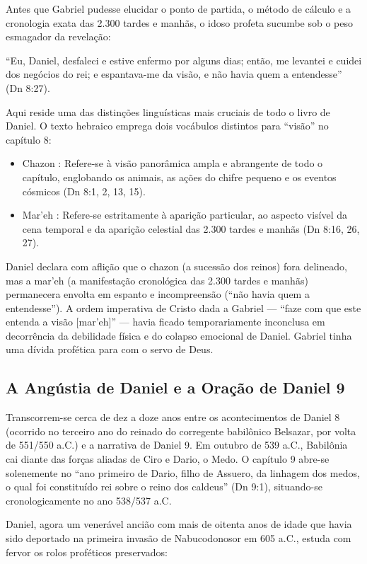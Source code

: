 \documentclass[11pt,a4paper,openany]{book}
\begin{document}
Antes que Gabriel pudesse elucidar o ponto de partida, o método de cálculo e a cronologia exata das 2.300 tardes e manhãs, o idoso profeta sucumbe sob o peso esmagador da revelação:

``Eu, Daniel, desfaleci e estive enfermo por alguns dias; então, me levantei e cuidei dos negócios do rei; e espantava-me da visão, e não havia quem a entendesse'' (Dn 8:27).

Aqui reside uma das distinções linguísticas mais cruciais de todo o livro de Daniel. O texto hebraico emprega dois vocábulos distintos para ``visão'' no capítulo 8:
\begin{itemize}
  \item Chazon : Refere-se à visão panorâmica ampla e abrangente de todo o capítulo, englobando os animais, as ações do chifre pequeno e os eventos cósmicos (Dn 8:1, 2, 13, 15).
  \item Mar'eh : Refere-se estritamente à aparição particular, ao aspecto visível da cena temporal e da aparição celestial das 2.300 tardes e manhãs (Dn 8:16, 26, 27).
\end{itemize}


Daniel declara com aflição que o chazon (a sucessão dos reinos) fora delineado, mas a mar'eh (a manifestação cronológica das 2.300 tardes e manhãs) permanecera envolta em espanto e incompreensão (``não havia quem a entendesse''). A ordem imperativa de Cristo dada a Gabriel — ``faze com que este entenda a visão [mar'eh]'' — havia ficado temporariamente inconclusa em decorrência da debilidade física e do colapso emocional de Daniel. Gabriel tinha uma dívida profética para com o servo de Deus.



\subsection{A Angústia de Daniel e a Oração de Daniel 9}


Transcorrem-se cerca de dez a doze anos entre os acontecimentos de Daniel 8 (ocorrido no terceiro ano do reinado do corregente babilônico Belsazar, por volta de 551/550 a.C.) e a narrativa de Daniel 9. Em outubro de 539 a.C., Babilônia cai diante das forças aliadas de Ciro e Dario, o Medo. O capítulo 9 abre-se solenemente no ``ano primeiro de Dario, filho de Assuero, da linhagem dos medos, o qual foi constituído rei sobre o reino dos caldeus'' (Dn 9:1), situando-se cronologicamente no ano 538/537 a.C.

Daniel, agora um venerável ancião com mais de oitenta anos de idade que havia sido deportado na primeira invasão de Nabucodonosor em 605 a.C., estuda com fervor os rolos proféticos preservados:
\end{document}
